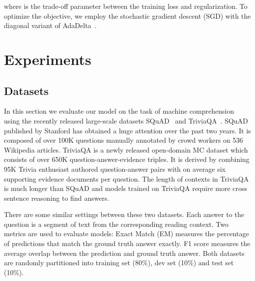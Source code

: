 \documentclass[letterpaper]{article} \usepackage{aaai18}  \usepackage{times}  \usepackage{helvet}  \usepackage{courier}  \usepackage{url}  \usepackage{graphicx}  \usepackage{booktabs}
\begin{document}
where  is the trade-off parameter between the training loss and regularization. To optimize the objective, we employ the stochastic gradient descent (SGD) with the diagonal variant of AdaDelta~\cite{Zeiler2012ADADELTA}.

 \section{Experiments}
 \subsection{Datasets}
 In this section we evaluate our model on the task of machine comprehension using the recently released large-scale datasets SQuAD~\cite{rajpurkar2016squad} and TriviaQA~\cite{Joshi2017TriviaQAAL}. SQuAD published by Stanford has obtained a huge attention over the past two years. It is composed of over 100K questions manually annotated by crowd workers on 536 Wikipedia articles. TriviaQA is a newly released open-domain MC dataset which consists of over 650K question-answer-evidence triples. It is derived by combining 95K Trivia enthusiast authored question-answer pairs with on average six supporting evidence documents per question. The length of contexts in TriviaQA is much longer than SQuAD and models trained on TriviaQA require more cross sentence reasoning to find answers. 
 
 There are some similar settings between these two datasets. Each answer to the question is a segment of text from the corresponding reading context. Two metrics are used to evaluate models: Exact Match (EM) measures the percentage of predictions that match the ground truth answer exactly. F1 score measures the average overlap between the prediction and ground truth answer. Both datasets are randomly partitioned into training set (80\%), dev set (10\%) and test set (10\%). 
 
\end{document}
